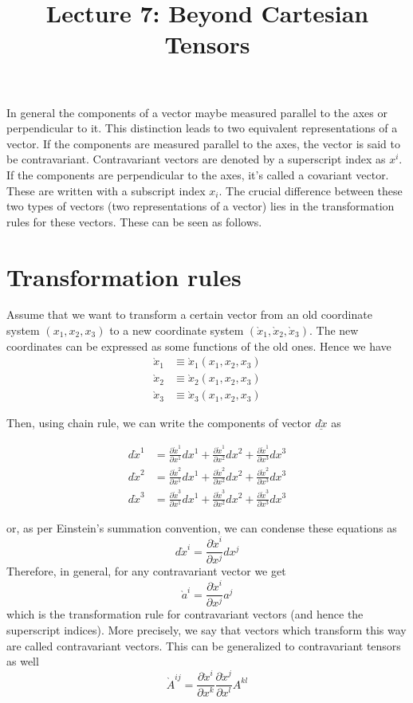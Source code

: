 \documentclass[11pt, letterpaper]{article}
\title{Lecture 7: Beyond Cartesian Tensors}
\newcommand{\1}{\bm{1}}
\newcommand{\pd}[2]{\frac{\partial #1}{\partial #2}}
\newcommand{\vect}[1]{\underline{#1}} %
\newcommand{\p}[1]{\grave{#1}} %
\begin{document}
\maketitle

In general the components of a vector maybe measured parallel to the axes or perpendicular to it. This distinction leads to two equivalent representations of a vector. If the components are measured parallel to the axes, the vector is said to be contravariant. Contravariant vectors are denoted by a superscript index as $x^i$. If the components are perpendicular to the axes, it's called a covariant vector. These are written with a subscript index $x_i$. The crucial difference between these two types of vectors (two representations of a vector) lies in the transformation rules for these vectors. These can be seen as follows.

\section{Transformation rules}
Assume that we want to transform a certain vector from an old coordinate system $(x_1, x_2, x_3)$ to a new coordinate system $(\p x_1, \p x_2, \p x_3)$. The new coordinates can be expressed as some functions of the old ones. Hence we have
\begin{align*}
\p x_1 &\equiv \p x_1(x_1, x_2, x_3)\\
\p x_2 &\equiv \p x_2(x_1, x_2, x_3)\\
\p x_3 &\equiv \p x_3(x_1, x_2, x_3)
\end{align*}

Then, using chain rule, we can write the components of vector $\vect{d\p x}$ as

\begin{align*}
d\p x^1 &= \pd{\p x^1}{x^1}dx^1+\pd{\p x^1}{x^2}dx^2+\pd{\p x^1}{x^3}dx^3\\
d\p x^2 &= \pd{\p x^2}{x^1}dx^1+\pd{\p x^2}{x^2}dx^2+\pd{\p x^2}{x^3}dx^3\\
d\p x^3 &= \pd{\p x^3}{x^1}dx^1+\pd{\p x^3}{x^2}dx^2+\pd{\p x^3}{x^3}dx^3
\end{align*}

or, as per Einstein's summation convention, we can condense these equations as
$$
d\p x^i=\pd{\p x^i}{x^j}dx^j
$$
Therefore, in general, for any contravariant vector we get
$$
\p a^i=\pd{\p x^i}{x^j}a^j
$$
which is the transformation rule for contravariant vectors (and hence the superscript indices). More precisely, we say that vectors which transform this way are called contravariant vectors. This can be generalized to contravariant tensors as well
$$
\p A^{ij}=\pd{\p x^i}{x^k}\pd{\p x^j}{x^l}A^{kl}
$$
\end{document}
